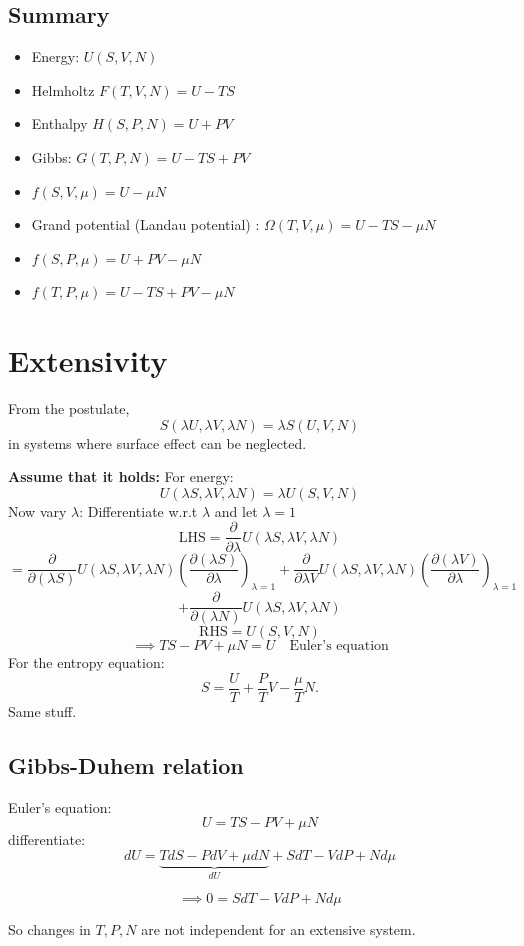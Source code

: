 \documentclass[11pt]{book}
\theoremstyle{definition}
\begin{document}
\subsection{Summary}
\begin{itemize}
	\item Energy: $ U(S,V,N) $ 
	\item Helmholtz $ F(T,V,N) = U - TS $ 
	\item Enthalpy $ H(S,P,N) = U + PV$ 
	\item Gibbs: $ G(T,P,N) = U-TS+PV $ 
	\item $ f(S,V,\mu) = U - \mu N $
	\item Grand potential (Landau potential) : $ \Omega(T,V,\mu) = U-TS-\mu N$
	\item  $ f(S,P,\mu) = U+PV-\mu N$
	\item $ f(T,P,\mu) = U-TS+PV-\mu N $ 
\end{itemize}

\section{Extensivity}
From the postulate,
\[ S(\lambda U, \lambda V, \lambda N) = \lambda S(U,V,N)\] in systems where surface effect can be neglected. 

\textbf{Assume that it holds:} 
For energy:
\[ U(\lambda S, \lambda V, \lambda N) = \lambda U(S,V,N) \] 
Now vary $ \lambda $:
Differentiate w.r.t $ \lambda $ and let $ \lambda =1 $ 
\[ \text{LHS} = \frac{\partial }{\partial \lambda} U(\lambda S, \lambda V, \lambda N) \] 
\[= \frac{\partial }{\partial (\lambda S)} U(\lambda S, \lambda V, \lambda N) \left (\frac{\partial (\lambda S)}{\partial \lambda} \right )_{\lambda = 1} + 
\frac{\partial }{\partial \lambda V} U(\lambda S, \lambda V, \lambda N) 
\left (\frac{\partial (\lambda V)}{\partial \lambda}\right )_{\lambda =1} \]
\[ + \frac{\partial }{\partial (\lambda N)}U(\lambda S, \lambda V, \lambda N)\] 
\[ \text{RHS} = U(S,V,N) \] 
\begin{equation}
	\implies TS-PV+\mu N = U \quad \text{Euler's equation}
\end{equation}
For the entropy equation:
\[ S = \frac{U}{T} + \frac{P}{T}V - \frac{\mu}{T}N. \] 
Same stuff.

\subsection{Gibbs-Duhem relation}
Euler's equation: \[ U = TS - PV + \mu N \] 
differentiate:
\[ dU = \underbrace{TdS -PdV + \mu dN}_{dU} + SdT - VdP + Nd\mu\] 
\begin{shaded*}
	\begin{equation}
		\implies 0 = SdT - VdP + N d\mu
	\end{equation}	
\end{shaded*}
So changes in $ T, P,N $ are not independent for an extensive system.
\end{document}
